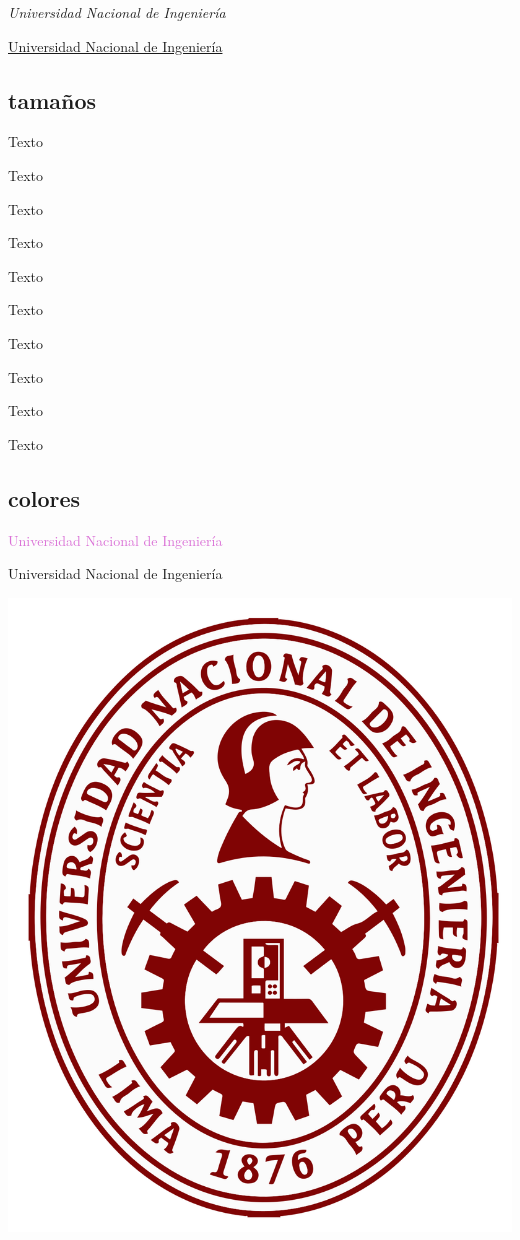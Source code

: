\documentclass[12pt,a4paper]{article}
\begin{document}
{\em Universidad Nacional de Ingeniería}

\underline{Universidad Nacional de Ingeniería}

\subsection{tamaños}

{\Huge Texto}

{\huge Texto}

{\LARGE Texto}

{\Large Texto}

{\large Texto}

{\normalsize Texto}

{\small Texto}

{\footnotesize Texto}

{\scriptsize Texto}

{\tiny Texto}

\subsection{colores}

\textcolor{Orchid}{Universidad Nacional de Ingeniería}

{\color{DarkOrchid} Universidad Nacional de Ingeniería}

\includegraphics{uni}
\end{document}
